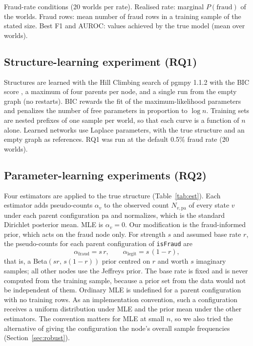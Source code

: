 \documentclass[final,5p,times,authoryear]{elsarticle}
\begin{document}
\begin{table}[H]
\centering\small
\begin{adjustbox}{max width=\linewidth}\end{adjustbox}
\caption{Fraud-rate conditions (20 worlds per rate). Realised rate: marginal $P(\text{fraud})$ of the worlds. Fraud rows: mean number of fraud rows in a training sample of the stated size. Best F1 and AUROC: values achieved by the true model (mean over worlds).}\label{tab:worlds}
\end{table}

\subsection{Structure-learning experiment (RQ1)}
Structures are learned with the Hill Climbing search of pgmpy 1.1.2 \citep{ankan2015} with the BIC score \citep{schwarz1978}, a maximum of four parents per node, and a single run from the empty graph (no restarts). BIC rewards the fit of the maximum-likelihood parameters and penalizes the number of free parameters in proportion to $\log n$. Training sets are nested prefixes of one sample per world, so that each curve is a function of $n$ alone. Learned networks use Laplace parameters, with the true structure and an empty graph as references. RQ1 was run at the default 0.5\% fraud rate (20 worlds).

\subsection{Parameter-learning experiments (RQ2)}
Four estimators are applied to the true structure (Table~\ref{tab:est}). Each estimator adds pseudo-counts $\alpha_v$ to the observed count $N_{v,\mathrm{pa}}$ of every state $v$ under each parent configuration $\mathrm{pa}$ and normalizes, which is the standard Dirichlet posterior mean. MLE is $\alpha_v=0$. Our modification is the fraud-informed prior, which acts on the fraud node only. For strength $s$ and assumed base rate $r$, the pseudo-counts for each parent configuration of \texttt{isFraud} are
\begin{equation}
\alpha_{\text{fraud}}=s\,r,\qquad \alpha_{\text{legit}}=s\,(1-r),
\end{equation}
that is, a Beta$(sr,\,s(1-r))$ prior centred on $r$ and worth $s$ imaginary samples; all other nodes use the Jeffreys prior. The base rate is fixed and is never computed from the training sample, because a prior set from the data would not be independent of them. Ordinary MLE is undefined for a parent configuration with no training rows. As an implementation convention, such a configuration receives a uniform distribution under MLE and the prior mean under the other estimators. The convention matters for MLE at small $n$, so we also tried the alternative of giving the configuration the node's overall sample frequencies (Section~\ref{sec:robust}).
\end{document}
